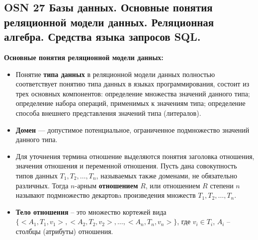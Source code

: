\subsection{OSN 27 Базы данных. Основные понятия реляционной модели данных. Реляционная алгебра. Средства языка запросов SQL.}


\textbf{Основные понятия реляционной модели данных:}

\begin{itemize}
    \item Понятие \textbf{типа данных} в реляционной модели данных полностью соответствует понятию типа данных в языках программирования, состоит из трех основных компонентов: определение множества значений данного типа; определение набора операций, применимых к значениям типа; определение способа внешнего представления значений типа (литералов).
    \item \textbf{Домен} --- допустимое потенциальное, ограниченное подмножество значений данного типа.
    \item Для уточнения термина отношение выделяются понятия заголовка отношения, значения отношения и переменной отношения.
    Пусть дана совокупность типов данных $T_1, T_2, \dots, T_n$, называемых также доменами, не обязательно различных. Тогда $n$-арным \textbf{отношением} $R$, или отношением $R$ степени $n$ называют подмножество декартовa произведения множеств $T_1, T_2, \dots, T_n$.
    \item \textbf{Тело отношения} -- это множество кортежей вида $\{<A_1, T_1, v_1>, < A_2, T_2, v_2 >,\dots, < A_n, T_n, v_n>\}$, где $v_i \in T_i$, $A_i$ -- столбцы (атрибуты) отношения. 

\end{itemize}

